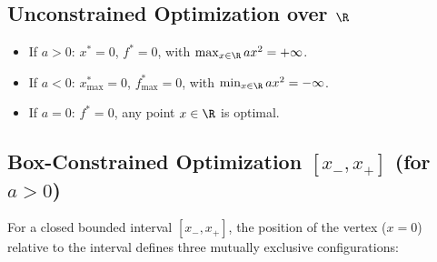 \subsection[Unconstrained Optimization on R]{Unconstrained Optimization over $\R$}
\begin{itemize}
    \item If $a > 0$: $x^* = 0$, $f^* = 0$, with $\max_{x \in \R} ax^2 = +\infty$.
    \item If $a < 0$: $x^*_{\max} = 0$, $f^*_{\max} = 0$, with $\min_{x \in \R} ax^2 = -\infty$.
    \item If $a = 0$: $f^* = 0$, any point $x \in \R$ is optimal.
\end{itemize}

\subsection[Box-Constrained Optimization]{Box-Constrained Optimization $[x_-, x_+]$ (for $a > 0$)}
For a closed bounded interval $[x_-, x_+]$, the position of the vertex ($x = 0$) relative to the interval defines three mutually exclusive configurations:


